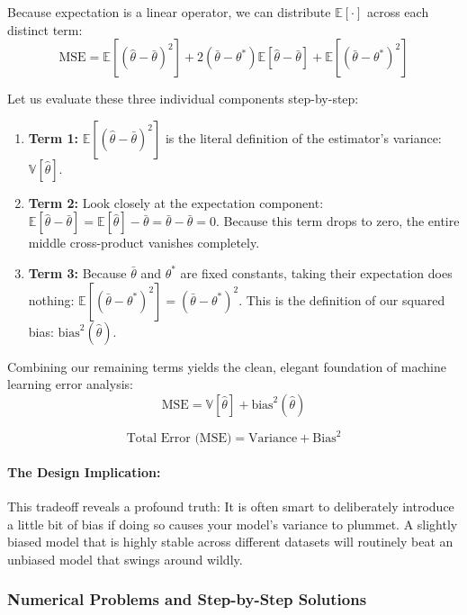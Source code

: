 \documentclass{article}
\begin{document}
Because expectation is a linear operator, we can distribute $\mathbb{E}[\cdot]$ across each distinct term:
\begin{equation}
\text{MSE} = \mathbb{E}\left[(\hat{\theta} - \bar{\theta})^2\right] + 2(\bar{\theta} - \theta^*)\mathbb{E}[\hat{\theta} - \bar{\theta}] + \mathbb{E}\left[(\bar{\theta} - \theta^*)^2\right]
\end{equation}

Let us evaluate these three individual components step-by-step:
\begin{enumerate}
    \item \textbf{Term 1:} $\mathbb{E}\left[(\hat{\theta} - \bar{\theta})^2\right]$ is the literal definition of the estimator's variance: $\mathbb{V}[\hat{\theta}]$.
    \item \textbf{Term 2:} Look closely at the expectation component: $\mathbb{E}[\hat{\theta} - \bar{\theta}] = \mathbb{E}[\hat{\theta}] - \bar{\theta} = \bar{\theta} - \bar{\theta} = 0$. Because this term drops to zero, the entire middle cross-product vanishes completely.
    \item \textbf{Term 3:} Because $\bar{\theta}$ and $\theta^*$ are fixed constants, taking their expectation does nothing: $\mathbb{E}\left[(\bar{\theta} - \theta^*)^2\right] = (\bar{\theta} - \theta^*)^2$. This is the definition of our squared bias: $\text{bias}^2(\hat{\theta})$.
\end{enumerate}

Combining our remaining terms yields the clean, elegant foundation of machine learning error analysis:
\begin{equation}
\text{MSE} = \mathbb{V}[\hat{\theta}] + \text{bias}^2(\hat{\theta})
\end{equation}

$$\text{Total Error (MSE)} = \text{Variance} + \text{Bias}^2$$

\paragraph{The Design Implication:}
This tradeoff reveals a profound truth: It is often smart to deliberately introduce a little bit of bias if doing so causes your model's variance to plummet. A slightly biased model that is highly stable across different datasets will routinely beat an unbiased model that swings around wildly.

\subsubsection{Numerical Problems and Step-by-Step Solutions}
\end{document}
